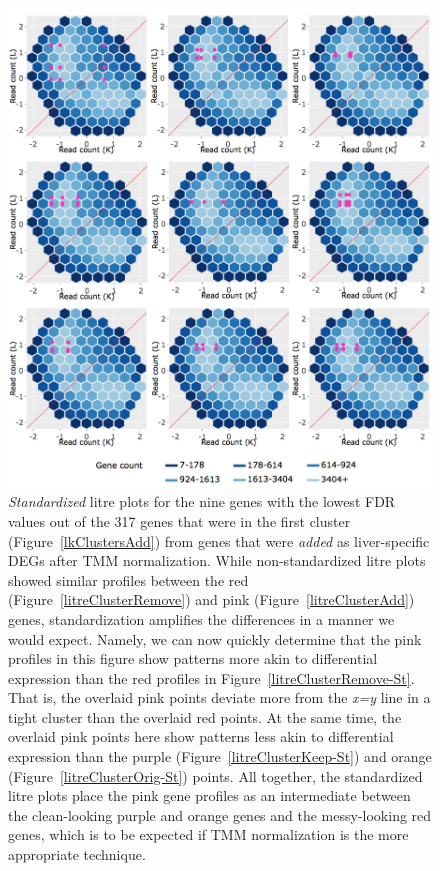 \documentclass[11pt,a4paper,oldfontcommands,openany]{memoir}
\numberwithin{equation}{section} %
\begin{document}
\null
\begin{figure}[t!]
\begin{framed}
\centerline{\includegraphics[width=\columnwidth]{MakeFigures/Dashboards/litreClusterAdd-St/litreClusterAdd-St.jpg}}
\end{framed}
\caption{\textit{Standardized} litre plots for the nine genes with the lowest FDR values out of the 317 genes that were in the first cluster (Figure~\ref{lkClustersAdd}) from genes that were \textit{added} as liver-specific DEGs after TMM normalization. While non-standardized litre plots showed similar profiles between the red (Figure~\ref{litreClusterRemove}) and pink (Figure~\ref{litreClusterAdd}) genes, standardization amplifies the differences in a manner we would expect. Namely, we can now quickly determine that the pink profiles in this figure show patterns more akin to differential expression than the red profiles in Figure~\ref{litreClusterRemove-St}. That is, the overlaid pink points deviate more from the \textit{x=y} line in a tight cluster than the overlaid red points. At the same time, the overlaid pink points here show patterns less akin to differential expression than the purple (Figure~\ref{litreClusterKeep-St}) and orange (Figure~\ref{litreClusterOrig-St}) points. All together, the standardized litre plots place the pink gene profiles as an intermediate between the clean-looking purple and orange genes and the messy-looking red genes, which is to be expected if TMM normalization is the more appropriate technique.
\label{litreClusterAdd-St}}
\end{figure}
\end{document}
